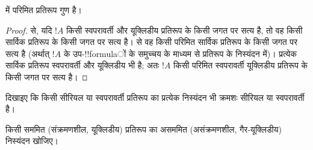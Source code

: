 \documentclass[../../../include/open-logic-section]{subfiles}
\begin{document}
\begin{cor}
   में परिमित प्रतिरूप गुण है।
\end{cor}

\begin{proof}
   से, यदि $!A$ किसी स्वपरावर्ती और
  यूक्लिडीय प्रतिरूप के किसी जगत पर सत्य है, तो वह किसी सार्विक प्रतिरूप
  के किसी जगत पर सत्य है।  से वह किसी परिमित सार्विक
  प्रतिरूप के किसी जगत पर सत्य है (अर्थात् $!A$ के उप-!!{formula}ों के
  समुच्चय के माध्यम से प्रतिरूप के निस्यंदन में)। प्रत्येक सार्विक प्रतिरूप
  स्वपरावर्ती और यूक्लिडीय भी है; अतः $!A$ किसी परिमित स्वपरावर्ती
  यूक्लिडीय प्रतिरूप के किसी जगत पर सत्य है।
\end{proof}

\begin{prob}
  दिखाइए कि किसी सीरियल या स्वपरावर्ती प्रतिरूप का प्रत्येक निस्यंदन भी
  क्रमशः सीरियल या स्वपरावर्ती है।
\end{prob}

\begin{prob}
  किसी सममित (संक्रमणशील, यूक्लिडीय) प्रतिरूप का असममित
  (असंक्रमणशील, गैर-यूक्लिडीय) निस्यंदन खोजिए।
\end{prob}
\end{document}
